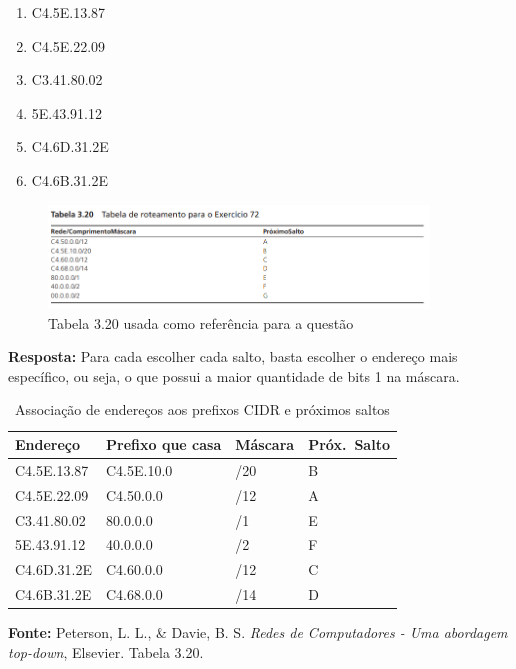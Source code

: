 \begin{enumerate}[label=\alph*.]
    \item C4.5E.13.87
    \item C4.5E.22.09
    \item C3.41.80.02
    \item 5E.43.91.12
    \item C4.6D.31.2E
    \item C4.6B.31.2E
\end{enumerate}

\begin{figure}[H]
    \centering
    \includegraphics[width=0.9\textwidth]{images/tabela_3_20.png}
    \caption{Tabela 3.20 usada como referência para a questão} 
    \label{fig:questao_3_tabela}
\end{figure}

\textbf{Resposta:}
Para cada escolher cada salto, basta escolher o endereço mais específico, ou seja, o que
possui a maior quantidade de bits 1 na máscara.\\

\begin{table}[ht]
\centering
\caption{Associação de endereços aos prefixos CIDR e próximos saltos}
\label{tab:roteamento}
\begin{tabular}{llll}
\toprule
\textbf{Endereço}      & \textbf{Prefixo que casa} & \textbf{Máscara} & \textbf{Próx.\ Salto} \\
\midrule
C4.5E.13.87 & C4.5E.10.0  & /20 & B \\
C4.5E.22.09 & C4.50.0.0   & /12 & A \\
C3.41.80.02 & 80.0.0.0    & /1  & E \\
5E.43.91.12 & 40.0.0.0    & /2  & F \\
C4.6D.31.2E & C4.60.0.0   & /12 & C \\
C4.6B.31.2E & C4.68.0.0   & /14 & D \\
\bottomrule
\end{tabular}
\end{table}
\FloatBarrier

\textbf{Fonte:} Peterson, L. L., \& Davie, B. S. \textit{Redes de Computadores - Uma abordagem top-down}, Elsevier. Tabela 3.20.

